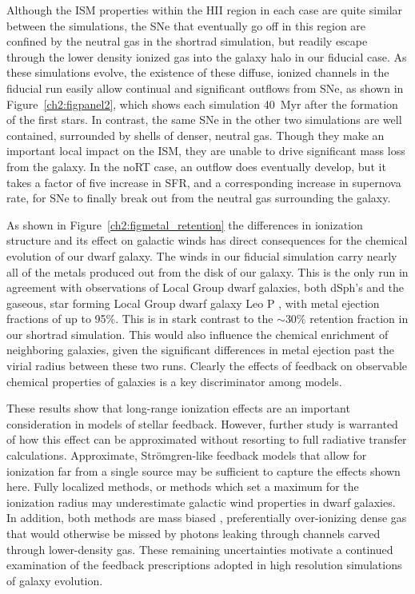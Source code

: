 Although the ISM properties within the HII region in each case are quite similar between the simulations, the SNe that eventually go off in this region are confined by the neutral gas in the shortrad simulation, but readily escape through the lower density ionized gas into the galaxy halo in our fiducial case. As these simulations evolve, the existence of these diffuse, ionized channels in the fiducial run easily allow continual and significant outflows from SNe, as shown in  Figure~\ref{ch2:figpanel2}, which shows each simulation 40~Myr after the formation of the first stars. In contrast, the same SNe in the other two simulations are well contained, surrounded by shells of denser, neutral gas. Though they make an important local impact on the ISM, they are unable to drive significant mass loss from the galaxy. In the noRT case, an outflow does eventually develop, but it takes a factor of five increase in SFR, and a corresponding increase in supernova rate, for SNe to finally break out from the neutral gas surrounding the galaxy.

As shown in Figure~\ref{ch2:figmetal_retention} the differences in ionization structure and its effect on galactic winds has direct consequences for the chemical evolution of our dwarf galaxy. The winds in our fiducial simulation carry nearly all of the metals produced out from the disk of our galaxy. This is the only run in agreement with observations of Local Group dwarf galaxies, both dSph's \citep{Kirby2011} and the gaseous, star forming Local Group dwarf galaxy Leo P \citep{McQuinn2015}, with metal ejection fractions of up to 95\%. This is in stark contrast to the $\sim$30\% retention fraction in our shortrad simulation. This would also influence the chemical enrichment of neighboring galaxies, given the significant differences in metal ejection past the virial radius between these two runs. Clearly the effects of feedback on observable chemical properties of galaxies is a key discriminator among models.

These results show that long-range ionization effects are an important consideration in models of stellar feedback. However,
further study is warranted of how this effect can be approximated without resorting to full radiative transfer calculations. Approximate, Str{\"o}mgren-like feedback models that allow for ionization far from a single source \citep[e.g.][]{Hopkins2018} may be sufficient to capture the effects shown here. Fully localized methods, or methods which set a maximum for the ionization radius may underestimate galactic wind properties in dwarf galaxies. In addition, both methods are mass biased \citep[see the discussion in ][]{Hu2017}, preferentially over-ionizing dense gas that would otherwise be missed by photons leaking through channels carved through lower-density gas. These remaining uncertainties motivate a continued examination of the feedback prescriptions adopted in high resolution simulations of galaxy evolution.

